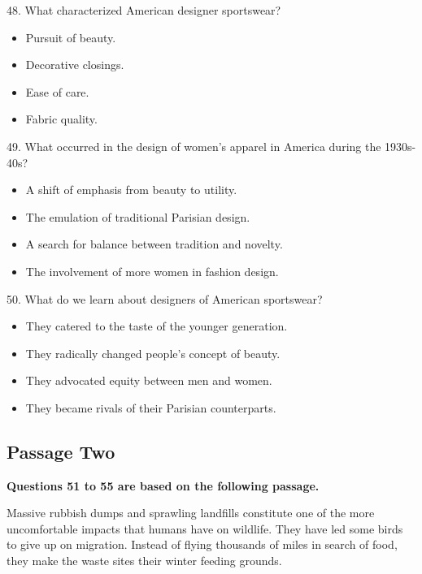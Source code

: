 \documentclass[UTF8,11pt]{ctexart}
\begin{document}
48. What characterized American designer sportswear?


\begin{itemize}[leftmargin=2em,itemsep=.2em,topsep=.4em]\item[A.] Pursuit of beauty.
\item[B.] Decorative closings.
\item[C.] Ease of care.
\item[D.] Fabric quality.
\end{itemize}

49. What occurred in the design of women’s apparel in America during the 1930s-40s?


\begin{itemize}[leftmargin=2em,itemsep=.2em,topsep=.4em]\item[A.] A shift of emphasis from beauty to utility.
\item[B.] The emulation of traditional Parisian design.
\item[C.] A search for balance between tradition and novelty.
\item[D.] The involvement of more women in fashion design.
\end{itemize}

50. What do we learn about designers of American sportswear?


\begin{itemize}[leftmargin=2em,itemsep=.2em,topsep=.4em]\item[A.] They catered to the taste of the younger generation.
\item[B.] They radically changed people’s concept of beauty.
\item[C.] They advocated equity between men and women.
\item[D.] They became rivals of their Parisian counterparts.
\end{itemize}

\subsection*{Passage Two}


\textbf{Questions 51 to 55 are based on the following passage.}


Massive rubbish dumps and sprawling landfills constitute one of the more uncomfortable impacts that humans have on wildlife. They have led some birds to give up on migration. Instead of flying thousands of miles in search of food, they make the waste sites their winter feeding grounds.
\end{document}
